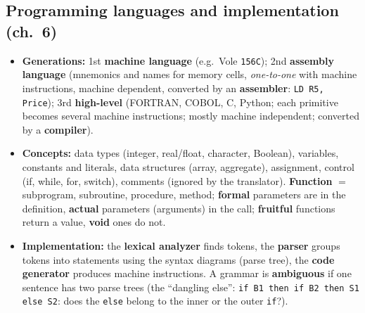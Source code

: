 \documentclass{fkt-notes}
\newcommand{\hx}[1]{\texttt{#1}}
\begin{document}
\subsection{Programming languages and implementation (ch.~6)}
\begin{itemize}[nosep]
  \item \textbf{Generations:} 1st \textbf{machine language} (e.g.\ Vole \hx{156C}); 2nd \textbf{assembly language} (mnemonics and names for memory cells, \emph{one-to-one} with
        machine instructions, machine dependent, converted by an \textbf{assembler}: \texttt{LD R5, Price}); 3rd \textbf{high-level} (FORTRAN, COBOL, C, Python; each primitive becomes
        several machine instructions; mostly machine independent; converted by a \textbf{compiler}).
  \item \textbf{Concepts:} data types (integer, real/float, character, Boolean), variables, constants and literals, data structures (array, aggregate), assignment, control
        (if, while, for, switch), comments (ignored by the translator). \textbf{Function} $=$ subprogram, subroutine, procedure, method; \textbf{formal} parameters are in the definition,
        \textbf{actual} parameters (arguments) in the call; \textbf{fruitful} functions return a value, \textbf{void} ones do not.
  \item \textbf{Implementation:} the \textbf{lexical analyzer} finds tokens, the \textbf{parser} groups tokens into statements using the syntax diagrams (parse tree), the
        \textbf{code generator} produces machine instructions. A grammar is \textbf{ambiguous} if one sentence has two parse trees (the ``dangling else'':
        \texttt{if B1 then if B2 then S1 else S2}: does the \texttt{else} belong to the inner or the outer \texttt{if}?).
\end{itemize}
\end{document}

